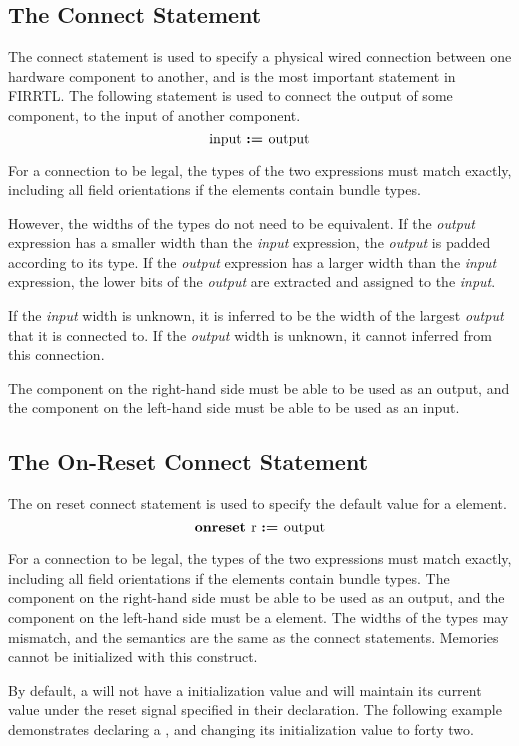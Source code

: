 \documentclass[12pt]{article}
\begin{document}
\subsection{The Connect Statement}
The connect statement is used to specify a physical wired connection between one hardware component to another, and is the most important statement in FIRRTL.
The following statement is used to connect the output of some component, to the input of another component. 
\[
\text{input } \text{\bf :=\ } \text{output} 
\]

For a connection to be legal, the types of the two expressions must match exactly, including all field orientations if the elements contain bundle types.

However, the widths of the types do not need to be equivalent.
If the {\em output} expression has a smaller width than the {\em input} expression, the {\em output} is padded according to its type.
If the {\em output} expression has a larger width than the {\em input} expression, the lower bits of the {\em output} are extracted and assigned to the {\em input}.

If the {\em input} width is unknown, it is inferred to be the width of the largest {\em output} that it is connected to.
If the {\em output} width is unknown, it cannot inferred from this connection.

The component on the right-hand side must be able to be used as an output, and the component on the left-hand side must be able to be used as an input.

\subsection{The On-Reset Connect Statement}
The on reset connect statement is used to specify the default value for a  element.
\[
\text{\bf onreset\ } \text{r } \text{\bf :=\ } \text{output} 
\]

For a connection to be legal, the types of the two expressions must match exactly, including all field orientations if the elements contain bundle types.
The component on the right-hand side must be able to be used as an output, and the component on the left-hand side must be a  element.
The widths of the types may mismatch, and the semantics are the same as the connect statements.
Memories cannot be initialized with this construct.

By default, a  will not have a initialization value and will maintain its current value under the reset signal specified in their declaration.
The following example demonstrates declaring a , and changing its initialization value to forty two.
\end{document}
